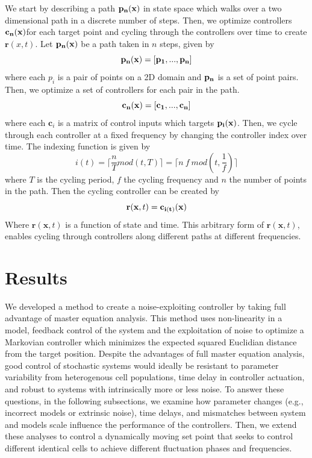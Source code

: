 \documentclass[12pt]{iopart}
\begin{document}
 We start by describing a path $\bf{p}_n(x)$ in state space which walks over a two dimensional path in a discrete number of steps.
  Then, we optimize controllers $\bf{c}_n(x)$for each target point and cycling through the controllers over time to create $\mathbf{r}(x,t)$.
Let  $\bf{p}_n(x)$ be a path taken in $n$ steps, given by
\begin{equation}
\bf{p}_n(x)=[p_1,...,p_n]
\end{equation}
where each $p_i$ is a pair of points on a 2D domain and $\bf{p}_n$ is a set of point pairs. Then, we optimize a set of controllers for each pair in the path.
\begin{equation}
\bf{c}_n(x)=[c_1,...,c_n]
\end{equation}
where each $\mathbf{c}_i$ is a matrix of control inputs which targets $\bf{p}_i(x)$.
Then, we cycle through each controller at a fixed frequency by changing the controller index over time. The indexing function is given by 
\begin{equation}
i(t)=\lceil \frac{n}{T} mod(t,T)\rceil = \lceil n \ f \ mod(t,\frac{1}{f})\rceil
\end{equation}
where $T$ is the cycling period, $f$ the cycling frequency and $n$ the number of points in the path. Then the cycling controller can be created by 
 \begin{equation}
\mathbf{r}(\mathbf{x},t)=\bf{c}_{i(t)}(x)
\end{equation}
Where $\mathbf{r}(\mathbf{x},t)$ is a function of state and time. This arbitrary form of $\mathbf{r}(\mathbf{x},t)$, enables cycling through controllers along different paths at different frequencies.


\section{Results}

We developed a method to create a noise-exploiting controller by taking full advantage of master equation analysis. This method uses non-linearity in a model, feedback control of the system and the exploitation of noise to optimize a Markovian controller which minimizes the expected squared Euclidian distance from the target position. Despite the advantages of full master equation analysis, good control of stochastic systems would ideally be resistant to parameter variability from heterogenous cell populations, time delay in controller actuation, and robust to systems with intrinsically more or less noise. To answer these questions, in the following subsections, we examine how parameter changes (e.g., incorrect models or extrinsic noise), time delays, and mismatches between system and models scale influence the performance of the controllers.
Then, we extend these analyses to control a dynamically moving set point that seeks to control different identical cells to achieve different fluctuation phases and frequencies. 
\end{document}
